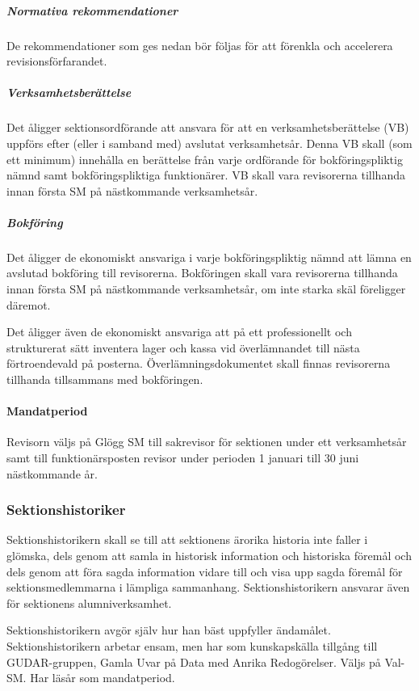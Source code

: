 \documentclass{dgovdoc}
\begin{document}
\subparagraph{Normativa rekommendationer}

De rekommendationer som ges nedan bör följas för att förenkla och accelerera revisionsförfarandet.

\subparagraph{Verksamhetsberättelse}

Det åligger sektionsordförande att ansvara för att en verksamhetsberättelse (VB) uppförs efter (eller i samband med) avslutat verksamhetsår. Denna VB skall (som ett minimum) innehålla en berättelse från varje ordförande för bokföringspliktig nämnd samt bokföringspliktiga funktionärer. VB skall vara revisorerna tillhanda innan första SM på nästkommande verksamhetsår.

\subparagraph{Bokföring}

Det åligger de ekonomiskt ansvariga i varje bokföringspliktig nämnd att lämna en avslutad bokföring till revisorerna. Bokföringen skall vara revisorerna tillhanda innan första SM på nästkommande verksamhetsår, om inte starka skäl föreligger däremot.

Det åligger även de ekonomiskt ansvariga att på ett professionellt och strukturerat sätt inventera lager och kassa vid överlämnandet till nästa förtroendevald på posterna. Överlämningsdokumentet skall finnas revisorerna tillhanda tillsammans med bokföringen.

\paragraph{Mandatperiod}

Revisorn väljs på Glögg SM till sakrevisor för sektionen under ett
verksamhetsår samt till funktionärsposten revisor under perioden 1 januari till
30 juni nästkommande år.

\subsubsection{Sektionshistoriker}

Sektionshistorikern skall se till att sektionens ärorika historia inte faller i
glömska, dels genom att samla in historisk information och historiska föremål och dels genom att föra sagda information vidare till och visa upp sagda föremål för sektionsmedlemmarna i lämpliga sammanhang. Sektionshistorikern ansvarar även för sektionens alumniverksamhet.

Sektionshistorikern avgör själv hur han bäst uppfyller ändamålet. Sektionshistorikern arbetar ensam, men har som kunskapskälla tillgång till GUDAR-gruppen, Gamla Uvar på Data med Anrika Redogörelser. Väljs på Val-SM. Har läsår som mandatperiod.
\end{document}
